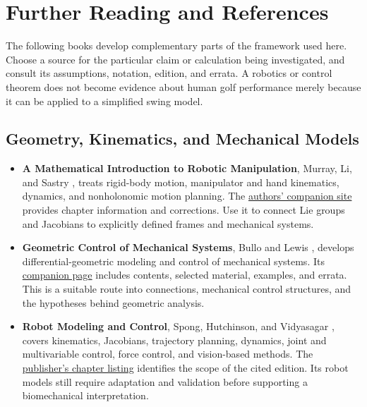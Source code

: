 \chapter{Further Reading and References}
\begingroup
\raggedbottom

The following books develop complementary parts of the framework used here. Choose a source for the particular claim or calculation being investigated, and consult its assumptions, notation, edition, and errata. A robotics or control theorem does not become evidence about human golf performance merely because it can be applied to a simplified swing model.

\section*{Geometry, Kinematics, and Mechanical Models}

\begin{itemize}
\item \textbf{A Mathematical Introduction to Robotic Manipulation}, Murray, Li, and Sastry \cite{Murray1994}, treats rigid-body motion, manipulator and hand kinematics, dynamics, and nonholonomic motion planning. The \href{https://www.cds.caltech.edu/~murray/mlswiki/index.php?title=Main_Page}{authors' companion site} provides chapter information and corrections. Use it to connect Lie groups and Jacobians to explicitly defined frames and mechanical systems.
\item \textbf{Geometric Control of Mechanical Systems}, Bullo and Lewis \cite{BulloLewis2004}, develops differential-geometric modeling and control of mechanical systems. Its \href{https://motion.me.ucsb.edu/book-gcms/}{companion page} includes contents, selected material, examples, and errata. This is a suitable route into connections, mechanical control structures, and the hypotheses behind geometric analysis.
\item \textbf{Robot Modeling and Control}, Spong, Hutchinson, and Vidyasagar \cite{Spong2006}, covers kinematics, Jacobians, trajectory planning, dynamics, joint and multivariable control, force control, and vision-based methods. The \href{https://bcs.wiley.com/he-bcs/Books?action=contents&bcsId=2888&itemId=0471649902}{publisher's chapter listing} identifies the scope of the cited edition. Its robot models still require adaptation and validation before supporting a biomechanical interpretation.
\end{itemize}

